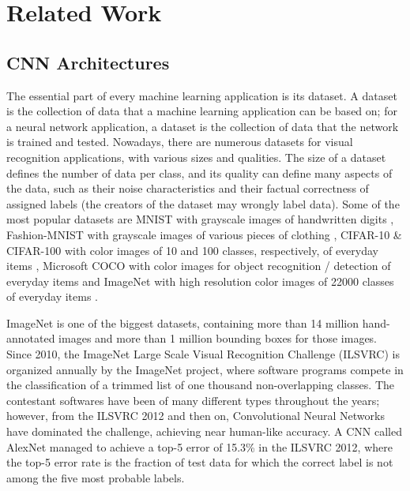 \chapter{Related Work}

\label{Chapter-Related-Work}

\section{CNN Architectures}
\label{section:CNN-Architectures}
The essential part of every machine learning application is its dataset. A dataset is the collection of data that a machine learning application can be based on; for a neural network application, a dataset is the collection of data that the network is trained and tested. Nowadays, there are numerous datasets for visual recognition applications, with various sizes and qualities. The size of a dataset defines the number of data per class, and its quality can define many aspects of the data, such as their noise characteristics and their factual correctness of assigned labels (the creators of the dataset may wrongly label data). Some of the most popular datasets are MNIST with grayscale images of handwritten digits \cite{The-MNIST-database-of-handwritten-digits} \cite{MNIST-database-Wikipedia}, Fashion-MNIST with grayscale images of various pieces of clothing \cite{Fashion-MNIST-a-Novel-Image-Dataset-for-Benchmarking-Machine-Learning-Algorithms} \cite{Fashion-MNIST-Github}, CIFAR-10 \& CIFAR-100 with color images of 10 and 100 classes, respectively, of everyday items \cite{CIFAR-10-CIFAR-100} \cite{CIFAR-10-CIFAR-100-Wikipedia}, Microsoft COCO with color images for object recognition / detection of everyday items \cite{Microsoft-COCO-Common-Objects-in-Context} \cite{MS-COCO} and ImageNet with high resolution color images of 22000 classes of everyday items \cite{ImageNet-Official-site} \cite{ImageNet-Wikipedia}.

ImageNet is one of the biggest datasets, containing more than 14 million hand-annotated images and more than 1 million bounding boxes for those images. Since 2010, the ImageNet Large Scale Visual Recognition Challenge (ILSVRC) is organized annually by the ImageNet project, where software programs compete in the classification of a trimmed list of one thousand non-overlapping classes. The contestant softwares have been of many different types throughout the years; however, from the ILSVRC 2012 and then on, Convolutional Neural Networks have dominated the challenge, achieving near human-like accuracy. A CNN called AlexNet \cite{ImageNet-classification-with-deep-convolutional-neural-networks} managed to achieve a top-5 error of 15.3\% in the ILSVRC 2012, where the top-5 error rate is the fraction of test data for which the correct label is not among the five most probable labels.


